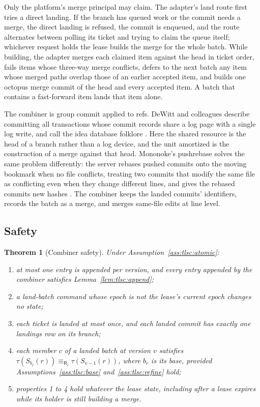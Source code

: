 \documentclass[11pt,letterpaper]{article}
\newtheorem{theorem}{Theorem}[section]
\theoremstyle{definition}
\theoremstyle{remark}
\newcommand{\R}{\mathsf{R}}
\newcommand{\Snap}[1]{S_{#1}}
\newcommand{\tree}{\tau}
\begin{document}
Only the platform's merge principal may claim. The adapter's land route first tries a direct landing. If the branch has queued work or the commit needs a merge, the direct landing is refused, the commit is enqueued, and the route alternates between polling its ticket and trying to claim the queue itself; whichever request holds the lease builds the merge for the whole batch. While building, the adapter merges each claimed item against the head in ticket order, fails items whose three-way merge conflicts, defers to the next batch any item whose merged paths overlap those of an earlier accepted item, and builds one octopus merge commit of the head and every accepted item. A batch that contains a fast-forward item lands that item alone.

The combiner is group commit applied to refs. DeWitt and colleagues describe committing all transactions whose commit records share a log page with a single log write, and call the idea database folklore \cite{dewitt1984main}. Here the shared resource is the head of a branch rather than a log device, and the unit amortized is the construction of a merge against that head. Mononoke's pushrebase solves the same problem differently: the server rebases pushed commits onto the moving bookmark when no file conflicts, treating two commits that modify the same file as conflicting even when they change different lines, and gives the rebased commits new hashes \cite{mononokepushrebase}. The combiner keeps the landed commits' identifiers, records the batch as a merge, and merges same-file edits at line level.

\subsection{Safety}

\begin{theorem}[Combiner safety]
\label{thm:tlsc:combiner-safety}
Under Assumption~\ref{ass:tlsc:atomic}:
\begin{enumerate}
\item at most one entry is appended per version, and every entry appended by the combiner satisfies Lemma~\ref{lem:tlsc:append};
\item a land-batch command whose epoch is not the lease's current epoch changes no state;
\item each ticket is landed at most once, and each landed commit has exactly one landings row on its branch;
\item each member $c$ of a landed batch at version $v$ satisfies $\tree(\Snap{b_c}(r))\equiv_{\R_c}\tree(\Snap{v-1}(r))$, where $b_c$ is its base, provided Assumptions~\ref{ass:tlsc:base} and~\ref{ass:tlsc:refine} hold;
\item properties 1 to 4 hold whatever the lease state, including after a lease expires while its holder is still building a merge.
\end{enumerate}
\end{theorem}
\end{document}
